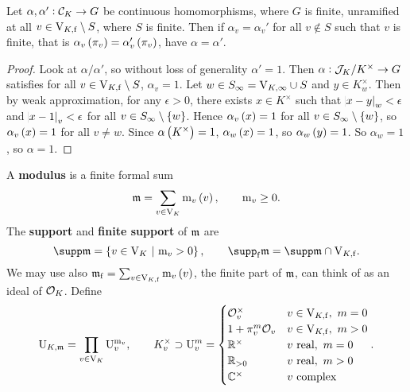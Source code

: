 
\begin{proposition}
\label{prop:8.2}
Let $ \alpha, \alpha' : \mathcal{C}_K \to G $ be continuous homomorphisms, where $ G $ is finite, unramified at all $ v \in \mathrm{V}_{K, \mathrm{f}} \setminus S $, where $ S $ is finite. Then if $ \alpha_v = \alpha_v' $ for all $ v \notin S $ such that $ v $ is finite, that is $ \alpha_v\br{\pi_v} = \alpha_v'\br{\pi_v} $, have $ \alpha = \alpha' $.
\end{proposition}

\begin{proof}
Look at $ \alpha / \alpha' $, so without loss of generality $ \alpha' = 1 $. Then $ \alpha : \mathcal{J}_K / K^\times \to G $ satisfies for all $ v \in \mathrm{V}_{K, \mathrm{f}} \setminus S $, $ \alpha_v = 1 $. Let $ w \in S_\infty = \mathrm{V}_{K, \infty} \cup S $ and $ y \in K_w^\times $. Then by weak approximation, for any $ \epsilon > 0 $, there exists $ x \in K^\times $ such that $ \abs{x - y}_w < \epsilon $ and $ \abs{x - 1}_v < \epsilon $ for all $ v \in S_\infty \setminus \cbr{w} $. Hence $ \alpha_v\br{x} = 1 $ for all $ v \in S_\infty \setminus \cbr{w} $, so $ \alpha_v\br{x} = 1 $ for all $ v \ne w $. Since $ \alpha\br{K^\times} = 1 $, $ \alpha_w\br{x} = 1 $, so $ \alpha_w\br{y} = 1 $. So $ \alpha_w = 1 $, so $ \alpha = 1 $.
\end{proof}

\pagebreak

\begin{definition*}
A \textbf{modulus} is a finite formal sum
$$ \mmm = \sum_{v \in \V_K} \m_v\br{v}, \qquad \m_v \ge 0. $$
The \textbf{support} and \textbf{finite support} of $ \mathfrak{m} $ are
$$ \supp \mmm = \cbr{v \in \V_K \st \m_v > 0}, \qquad \supp_\f \mmm = \supp \mmm \cap \V_{K, \f}. $$
We may use also $ \mmm_\f = \sum_{v \in \V_{K, \f}} \m_v\br{v} $, the finite part of $ \mathfrak{m} $, can think of as an ideal of $ \mathcal{O}_K $. Define
$$ \mathrm{U}_{K, \mathfrak{m}} = \prod_{v \in \mathrm{V}_K} \mathrm{U}_v^{\mathrm{m}_v}, \qquad K_v^\times \supset \mathrm{U}_v^m =
\begin{cases}
\mathcal{O}_v^\times & v \in \mathrm{V}_{K, \mathrm{f}}, \ m = 0 \\
1 + \pi_v^m\mathcal{O}_v & v \in \mathrm{V}_{K, \mathrm{f}}, \ m > 0 \\
\mathbb{R}^\times & v \ \text{real}, \ m = 0 \\
\mathbb{R}_{> 0} & v \ \text{real}, \ m > 0 \\
\mathbb{C}^\times & v \ \text{complex}
\end{cases}.
$$
\end{definition*}

